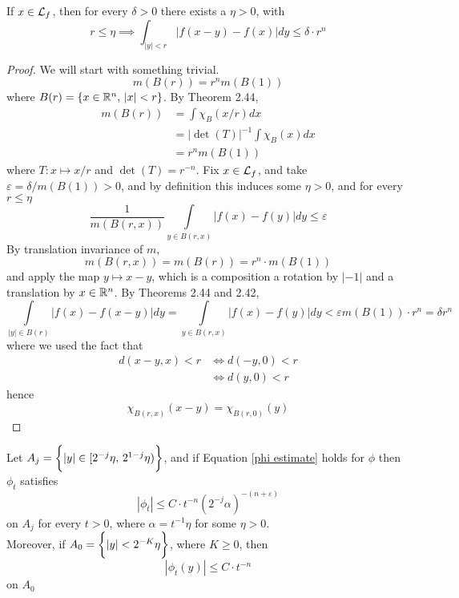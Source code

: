 \documentclass[../../main.tex]{subfiles}
\begin{document}
\begin{lemma}\label{lemma:lebesgue set estimate}
    If $x\in\mathcal{L}_f$, then for every $\delta>0$ there exists a $\eta>0$, with\[r\leq\eta\implies\int_{|y|<r}|f(x-y)-f(x)|dy\leq\delta\cdot r^n\]
\end{lemma}
\begin{proof}
    We will start with something trivial.\begin{equation}\label{ball rn multiple}
        m(B(r))=r^nm(B(1))
    \end{equation}
    where $B(r)=\{x\in\mathbb{R}^n,\,|x|<r\}$. By Theorem 2.44,\begin{align*}
        m(B(r))&=\int\chi_B(x/r)dx\\
        &= |\det(T)|^{-1}\int \chi_B(x)dx\\
        &=r^nm(B(1))
    \end{align*}
    where $T:x\mapsto x/r$ and $\det(T)=r^{-n}$. Fix $x\in\mathcal{L}_f$, and take $\varepsilon=\delta/m(B(1))>0$, and by definition this induces some $\eta>0$, and for every $r\leq\eta$
    \[\dfrac{1}{m(B(r,x))}\int\limits_{y\in B(r,x)}|f(x)-f(y)|dy\leq\varepsilon\] 
    By translation invariance of $m$, \[m(B(r,x))=m(B(r))=r^n\cdot m(B(1))\]
    and apply the map $y\mapsto x-y$, which is a composition a rotation by $|-1|$ and a translation by $x\in\mathbb{R}^n$. By Theorems 2.44 and 2.42, \[\int\limits_{|y|\in B(r)}|f(x)-f(x-y)|dy=\int\limits_{y\in B(r,x)}|f(x)-f(y)|dy<\varepsilon m(B(1))\cdot r^n =\delta r^n\]
    where we used the fact that\begin{align*}d(x-y,x)<r&\iff d(-y,0)<r\\
    &\iff d(y,0)<r
    \end{align*}
    hence\[\chi_{B(r,x)}(x-y)=\chi_{B(r,0)}(y)\]
\end{proof}
\begin{lemma}\label{lemma:phi estimates}
    Let $A_j = \biggl\{{|y|\in[2^{-j}\eta,\,2^{1-j}\eta)}\biggr\}$, and if Equation \eqref{phi estimate} holds for $\phi$ then $\phi_t$ satisfies 
    \begin{equation}\label{phi estimate on Aj}
        |\phi_t|\leq C\cdot t^{-n}(2^{-j}\alpha)^{-(n+\varepsilon)}
    \end{equation}
    on $A_j$ for every $t>0$, where $\alpha=t^{-1}\eta$ for some $\eta>0$. \\
    
    Moreover, if $A_0 = \biggl\{{|y|<2^{-K}\eta}\biggr\}$, where $K\geq 0$, then \begin{equation}\label{phi estimate on A0}|\phi_t(y)|\leq C\cdot t^{-n}\end{equation} on $A_0$
\end{lemma}
\end{document}

